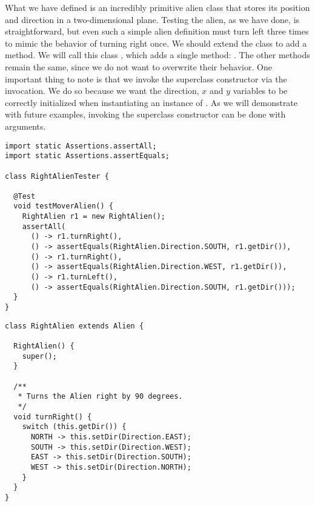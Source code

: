What we have defined is an incredibly primitive alien class that stores its position and direction in a two-dimensional plane. Testing the alien, as we have done, is straightforward, but even such a simple alien definition must turn left three times to mimic the behavior of turning right once. We should extend the  class to add a  method. We will call this class , which adds a single method: . The other methods remain the same, since we do not want to overwrite their behavior. One important thing to note is that we invoke the superclass constructor via the  invocation. We do so because we want the direction, $x$ and $y$ variables to be correctly initialized when instantiating an instance of . As we will demonstrate with future examples, invoking the superclass constructor can be done with arguments.


\begin{lstlisting}[language=MyJava]
import static Assertions.assertAll;
import static Assertions.assertEquals;

class RightAlienTester {

  @Test
  void testMoverAlien() {
    RightAlien r1 = new RightAlien();
    assertAll(
      () -> r1.turnRight(),
      () -> assertEquals(RightAlien.Direction.SOUTH, r1.getDir()),
      () -> r1.turnRight(),
      () -> assertEquals(RightAlien.Direction.WEST, r1.getDir()),
      () -> r1.turnLeft(),
      () -> assertEquals(RightAlien.Direction.SOUTH, r1.getDir()));
  }
}
\end{lstlisting}

\begin{lstlisting}[language=MyJava]
class RightAlien extends Alien {

  RightAlien() { 
    super(); 
  }

  /**
   * Turns the Alien right by 90 degrees.
   */
  void turnRight() {
    switch (this.getDir()) {
      NORTH -> this.setDir(Direction.EAST);
      SOUTH -> this.setDir(Direction.WEST);
      EAST -> this.setDir(Direction.SOUTH);
      WEST -> this.setDir(Direction.NORTH);
    }
  }
}
\end{lstlisting}

